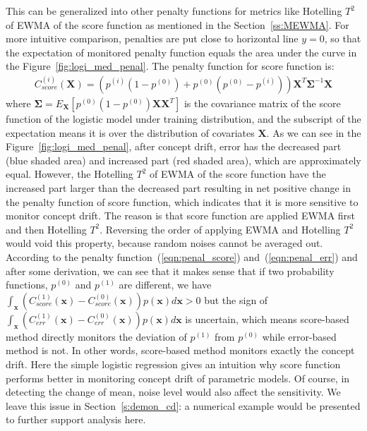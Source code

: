 \documentclass[twoside,11pt]{article}
\begin{document}
This can be generalized into other penalty functions for metrics like Hotelling $T^2$ of EWMA of the score function as mentioned in the Section~\ref{ss:MEWMA}. For more intuitive comparison, penalties are put close to horizontal line $y=0$, so that the expectation of monitored penalty function equals the area under the curve in the Figure~\ref{fig:logi_med_penal}.
The penalty function for score function is:
\begin{align}
C _{score}^{(i)}(\bm {X}) = (p ^{(i)} (1 - p ^{(0)}) + p ^{(0)}(p ^{(0)}-p ^{(i)})) \bm {X}^T\bm { \Sigma}^{-1}\bm {X}
\label{eqn:penal_score}
\end{align}
where $\bm { \Sigma} = E _{\bm {X}}[p ^{(0)}(1-p ^{(0)})\bm {X}\bm {X}^T]$ is the covariance matrix of the score function of the logistic model under training distribution, and the subscript of the expectation means it is over the distribution of covariates $\bm {X}$. As we can see in the Figure~\ref{fig:logi_med_penal}, after concept drift, error has the decreased part (blue shaded area) and increased part (red shaded area), which are approximately equal. However, the Hotelling $T^2$ of EWMA of the score function have the increased part larger than the decreased part resulting in net positive change in the penalty function of score function, which indicates that it is more sensitive to monitor concept drift. The reason is that score function are applied EWMA first and then Hotelling $T^2$. Reversing the order of applying EWMA and Hotelling $T^2$ would void this property, because random noises cannot be averaged out. According to the penalty function~(\ref{eqn:penal_score}) and~(\ref{eqn:penal_err}) and after some derivation, we can see that it makes sense that if two probability functions, $p ^{(0)}$ and $p ^{(1)}$ are different, we have $\int_{\bm{x}}(C _{score}^{(1)}(\bm {x})-C _{score}^{(0)}(\bm {x}))p(\bm{x})d\bm{x}>0$ but the sign of $\int_{\bm{x}}(C _{err}^{(1)}(\bm {x})-C _{err}^{(0)}(\bm {x}))p(\bm{x})d\bm{x}$ is uncertain, which means score-based method directly monitors the deviation of $p ^{(1)}$ from $p ^{(0)}$ while error-based method is not. In other words, score-based method monitors exactly the concept drift. Here the simple logistic regression gives an intuition why score function performs better in monitoring concept drift of parametric models. Of course, in detecting the change of mean, noise level would also affect the sensitivity. We leave this issue in Section~\ref{s:demon_cd}: a numerical example would be presented to further support analysis here.
\end{document}
